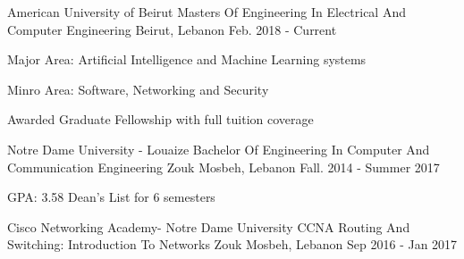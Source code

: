 

\begin{cventries}

  \cventry
    {American University of Beirut} %
    {Masters Of Engineering In Electrical And Computer Engineering} %
    {Beirut, Lebanon} %
    {Feb. 2018 - Current} %
    {
      \begin{cvitems} %
        \item Major Area: Artificial Intelligence and Machine Learning systems
        \item Minro Area: Software, Networking and Security
        \item {Awarded Graduate Fellowship with full tuition coverage }
      \end{cvitems}
    }

  \cventry
    {Notre Dame University - Louaize} %
    {Bachelor Of Engineering In Computer And Communication Engineering} %
    {Zouk Mosbeh, Lebanon} %
    {Fall. 2014 - Summer 2017} %
    {
      \begin{cvitems} %
        \item {GPA: 3.58   Dean’s  List for 6 semesters}
      \end{cvitems}
    }


  \cventry
    {Cisco Networking Academy- Notre Dame University} %
    {CCNA Routing And Switching: Introduction To Networks} %
    {Zouk Mosbeh, Lebanon} %
    {Sep 2016 - Jan 2017} %
    {}


\end{cventries}
